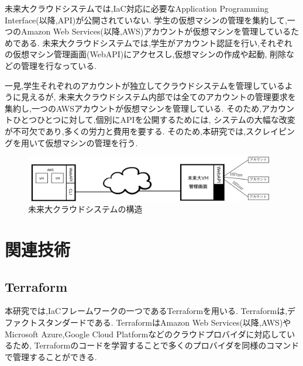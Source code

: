 \documentclass[11pt]{ujarticle}\sloppy
\begin{document}
未来大クラウドシステムでは,IaC対応に必要なApplication Programming Interface(以降,API)が公開されていない.
学生の仮想マシンの管理を集約して,一つのAmazon Web Services(以降,AWS)アカウントが仮想マシンを管理しているためである.
未来大クラウドシステムでは,学生がアカウント認証を行い,それぞれの仮想マシン管理画面(WebAPI)にアクセスし,仮想マシンの作成や起動, 削除などの管理を行なっている.

一見,学生それぞれのアカウントが独立してクラウドシステムを管理しているように見えるが,
未来大クラウドシステム内部では全てのアカウントの管理要求を集約し,一つのAWSアカウントが仮想マシンを管理している.
そのため,アカウントひとつひとつに対して,個別にAPIを公開するためには,
システムの大幅な改変が不可欠であり,多くの労力と費用を要する.
そのため,本研究では,スクレイピングを用いて仮想マシンの管理を行う.


\begin{figure}[h]
	\includegraphics[width=1\linewidth,height=2cm]{./images/cloud.png}
	\caption{未来大クラウドシステムの構造}
	\label{fig:cloud}
\end{figure}


\section{関連技術}

\subsection{Terraform}

本研究では,IaCフレームワークの一つであるTerraformを用いる.
Terraformは,デファクトスタンダードである.
TerraformはAmazon Web Services(以降,AWS)や
Microsoft Azure,Google Cloud Platformなどのクラウドプロバイダに対応しているため,
Terraformのコードを学習することで多くのプロバイダを同様のコマンドで管理することができる.
\end{document}
